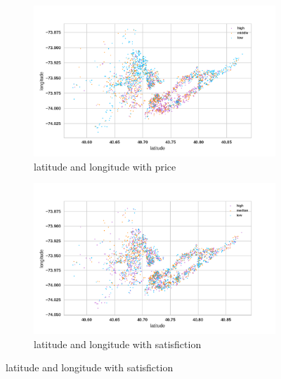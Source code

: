 \documentclass[12pt]{article}
\begin{document}
\begin{figure}
    \begin{subfigure}[b]{0.45\textwidth}
        \includegraphics[width=\textwidth]{images/pair-latitude-longitude-price.png}
        \caption{latitude and longitude with price}
        \label{fig:pair-bedrooms-price}
    \end{subfigure}
    \begin{subfigure}[b]{0.45\textwidth}
        \includegraphics[width=\textwidth]{images/pair-latitude-longitude-satisfiction.png}
        \caption{latitude and longitude with satisfiction}
        \label{fig:pair-latitude-longitude-satisfiction}
    \end{subfigure}
    

\end{figure}
\end{document}
